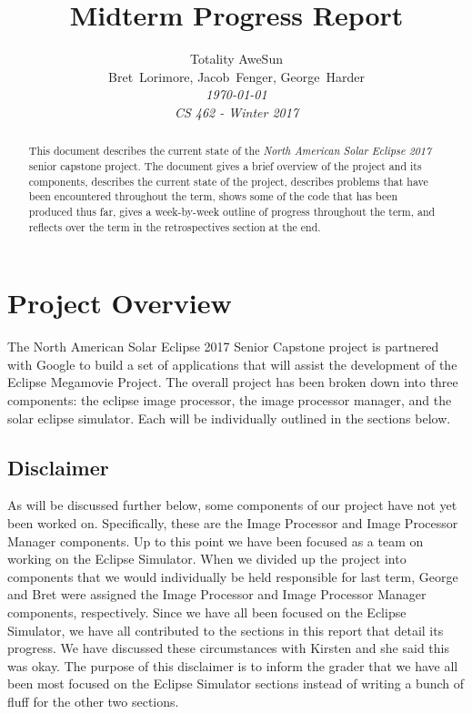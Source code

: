 \documentclass[10pt, onecolumn, draftclsnofoot, letterpaper, compsoc]{IEEEtran}
\title{Midterm Progress Report}
\author{Totality AweSun \\
		Bret~Lorimore, Jacob~Fenger, George~Harder \\
		\textit{\today \\
		CS 462 - Winter 2017}}
\begin{document}
\maketitle

\begin{abstract}
This document describes the current state of the \textit{North American Solar Eclipse 2017}
senior capstone project. The document gives a brief overview of the project and its components,
describes the current state of the project, describes problems that have been
encountered throughout the term, shows some of the code that has been produced thus far, gives
a week-by-week outline of progress throughout the term, and reflects over the term in the
retrospectives section at the end.
\end{abstract}

\newpage

\tableofcontents

\newpage

\section{Project Overview}

The North American Solar Eclipse 2017 Senior Capstone project is partnered
with Google to build a set of applications that will assist the development of
the Eclipse Megamovie Project. The overall project has been broken down into
three components: the eclipse image processor, the image processor manager, and
the solar eclipse simulator. Each will be individually outlined in the sections
below.

\subsection{Disclaimer}

As will be discussed further below, some components of our project have not yet been worked on.
Specifically, these are the Image Processor and Image Processor Manager components. Up to this point
we have been focused as a team on working on the Eclipse Simulator. When we divided up the project
into components that we would individually be held responsible for last term, George and Bret were
assigned the Image Processor and Image Processor Manager components, respectively. Since we have all
been focused on the Eclipse Simulator, we have all contributed to the sections in this report
that detail its progress. We have discussed these circumstances with Kirsten and she said this was
okay. The purpose of this disclaimer is to inform the grader that we have all been most focused
on the Eclipse Simulator sections instead of writing a bunch of fluff for the other two sections.
\end{document}

